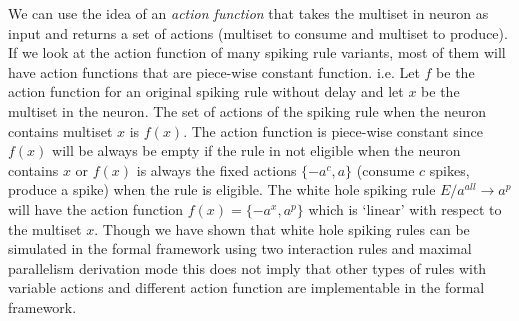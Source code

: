 \documentclass[a4paper]{article}
\theoremstyle{definition}
\newcommand{\ra}{\rightarrow}
\begin{document}
We can use the idea of an \emph{action function} that takes the multiset in neuron as input and returns
a set of actions (multiset to consume and multiset to produce). If we look at the action function
of many spiking rule variants, most of them will have action functions that are piece-wise constant
function. i.e. Let $f$ be the action function for an original spiking rule without delay and let
$x$ be the multiset in the neuron. The set of actions of the spiking rule when the neuron contains 
multiset $x$ is $f(x)$. The action function is piece-wise constant since $f(x)$ will be always be 
empty if the rule in not eligible when the neuron contains  $x$ or $f(x)$ is always the fixed 
actions $\{-a^c,a\}$ (consume $c$ spikes, produce a spike) when the rule is eligible. The white hole
spiking rule $E/a^{all} \ra a^p$ will have the action function $f(x) = \{-a^x,a^p\}$ which is 
`linear' with respect to the multiset $x$. Though we have shown that white hole spiking rules can be
simulated in the formal framework using two interaction rules and maximal parallelism derivation mode
this does not imply that other types of rules with variable actions and different action function 
are implementable in the formal framework.
\end{document}
